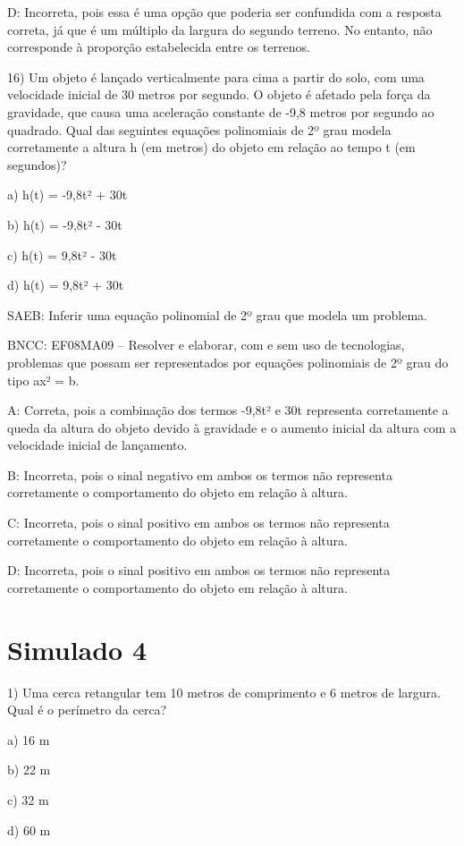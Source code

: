 D: Incorreta, pois essa é uma opção que poderia ser confundida com a
resposta correta, já que é um múltiplo da largura do segundo terreno. No
entanto, não corresponde à proporção estabelecida entre os terrenos.

16) Um objeto é lançado verticalmente para cima a partir do solo, com
uma velocidade inicial de 30 metros por segundo. O objeto é afetado pela
força da gravidade, que causa uma aceleração constante de -9,8 metros
por segundo ao quadrado. Qual das seguintes equações polinomiais de 2º
grau modela corretamente a altura h (em metros) do objeto em relação ao
tempo t (em segundos)?

a) h(t) = -9,8t² + 30t

b) h(t) = -9,8t² - 30t

c) h(t) = 9,8t² - 30t

d) h(t) = 9,8t² + 30t

SAEB: Inferir uma equação polinomial de 2º grau que modela um problema.

BNCC: EF08MA09 -- Resolver e elaborar, com e sem uso de tecnologias,
problemas que possam ser representados por equações polinomiais de 2º
grau do tipo ax² = b.

A: Correta, pois a combinação dos termos -9,8t² e 30t representa
corretamente a queda da altura do objeto devido à gravidade e o aumento
inicial da altura com a velocidade inicial de lançamento.

B: Incorreta, pois o sinal negativo em ambos os termos não representa
corretamente o comportamento do objeto em relação à altura.

C: Incorreta, pois o sinal positivo em ambos os termos não representa
corretamente o comportamento do objeto em relação à altura.

D: Incorreta, pois o sinal positivo em ambos os termos não representa
corretamente o comportamento do objeto em relação à altura.

\hypertarget{simulado-4}{%
\section{Simulado 4}\label{simulado-4}}

1) Uma cerca retangular tem 10 metros de comprimento e 6 metros de
largura. Qual é o perímetro da cerca?

a) 16 m

b) 22 m

c) 32 m

d) 60 m

